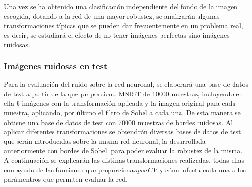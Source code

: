 Una vez se ha obtenido una clasificación independiente del fondo de la imagen escogida, dotando a la red de una mayor robustez, se analizarán algunas transformaciones típicas que se pueden dar frecuentemente en un problema real, es decir, se estudiará el efecto de no tener imágenes perfectas sino imágenes ruidosas.

\subsubsection{Imágenes ruidosas en test}

Para la evaluación del ruido sobre la red neuronal, se elaborará una base de datos de test a partir de la que proporciona MNIST de 10000 muestras, incluyendo en ella 6 imágenes con la transformación aplicada y la imagen original para cada muestra, aplicando, por último el filtro de Sobel a cada una. De esta manera se obtiene una base de datos de test con 70000 muestras de bordes ruidosas. Al aplicar diferentes transformaciones se obtendrán diversas bases de datos de test que serán introducidas sobre la misma red neuronal, la desarrollada anteriormente con bordes de Sobel, para poder evaluar la robustez de la misma.\\

A continuación se explicarán las distinas transformaciones realizadas, todas ellas con ayuda de las funciones que proporciona\textit{openCV} y cómo afecta cada una a los parámentros que permiten evaluar la red.\\

